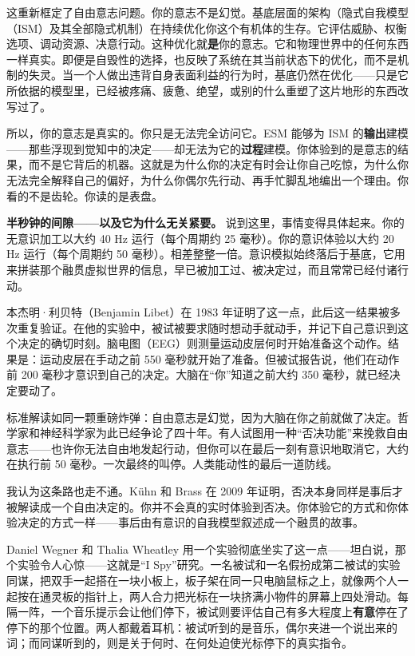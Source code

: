 \documentclass[11pt, twoside, openright]{book}
\begin{document}
这重新框定了自由意志问题。你的意志不是幻觉。基底层面的架构（隐式自我模型（ISM）及其全部隐式机制）在持续优化你这个有机体的生存。它评估威胁、权衡选项、调动资源、决意行动。这种优化就\textbf{是}你的意志。它和物理世界中的任何东西一样真实。即便是自毁性的选择，也反映了系统在其当前状态下的优化，而不是机制的失灵。当一个人做出违背自身表面利益的行为时，基底仍然在优化------只是它所依据的模型里，已经被疼痛、疲惫、绝望，或别的什么重塑了这片地形的东西改写过了。

所以，你的意志是真实的。你只是无法完全访问它。ESM 能够为 ISM 的\textbf{输出}建模------那些浮现到觉知中的决定------却无法为它的\textbf{过程}建模。你体验到的是意志的结果，而不是它背后的机器。这就是为什么你的决定有时会让你自己吃惊，为什么你无法完全解释自己的偏好，为什么你偶尔先行动、再手忙脚乱地编出一个理由。你看的不是齿轮。你读的是表盘。

\textbf{半秒钟的间隙------以及它为什么无关紧要。} 说到这里，事情变得具体起来。你的无意识加工以大约 40 Hz 运行（每个周期约 25 毫秒）。你的意识体验以大约 20 Hz 运行（每个周期约 50 毫秒）。相差整整一倍。意识模拟始终落后于基底，它用来拼装那个融贯虚拟世界的信息，早已被加工过、被决定过，而且常常已经付诸行动。

本杰明·利贝特（Benjamin Libet）在 1983 年证明了这一点，此后这一结果被多次重复验证。在他的实验中，被试被要求随时想动手就动手，并记下自己意识到这个决定的确切时刻。脑电图（EEG）则测量运动皮层何时开始准备这个动作。结果是：运动皮层在手动之前 550 毫秒就开始了准备。但被试报告说，他们在动作前 200 毫秒才意识到自己的决定。大脑在“你”知道之前大约 350 毫秒，就已经决定要动了。

标准解读如同一颗重磅炸弹：自由意志是幻觉，因为大脑在你之前就做了决定。哲学家和神经科学家为此已经争论了四十年。有人试图用一种“否决功能”来挽救自由意志------也许你无法自由地发起行动，但你可以在最后一刻有意识地取消它，大约在执行前 50 毫秒。一次最终的叫停。人类能动性的最后一道防线。

我认为这条路也走不通。Kühn 和 Brass 在 2009 年证明，否决本身同样是事后才被解读成一个自由决定的。你并不会真的实时体验到否决。你体验它的方式和你体验决定的方式一样------事后由有意识的自我模型叙述成一个融贯的故事。

Daniel Wegner 和 Thalia Wheatley 用一个实验彻底坐实了这一点------坦白说，那个实验令人心惊------这就是“I Spy”研究。一名被试和一名假扮成第二被试的实验同谋，把双手一起搭在一块小板上，板子架在同一只电脑鼠标之上，就像两个人一起按在通灵板的指针上，两人合力把光标在一块挤满小物件的屏幕上四处滑动。每隔一阵，一个音乐提示会让他们停下，被试则要评估自己有多大程度上\textbf{有意}停在了停下的那个位置。两人都戴着耳机：被试听到的是音乐，偶尔夹进一个说出来的词；而同谋听到的，则是关于何时、在何处迫使光标停下的真实指令。
\end{document}
